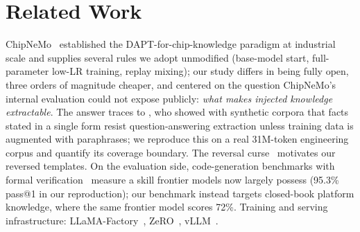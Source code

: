 \section{Related Work}
\label{sec:related}

ChipNeMo~\citep{liu2023chipnemo} established the DAPT-for-chip-knowledge
paradigm at industrial scale and supplies several rules we adopt unmodified
(base-model start, full-parameter low-LR training, replay mixing); our study
differs in being fully open, three orders of magnitude cheaper, and centered
on the question ChipNeMo's internal evaluation could not expose publicly:
\emph{what makes injected knowledge extractable}. The answer traces to
\citet{allenzhu2023physics31}, who showed with synthetic corpora that facts
stated in a single form resist question-answering extraction unless training
data is augmented with paraphrases; we reproduce this on a real 31M-token
engineering corpus and quantify its coverage boundary. The reversal
curse~\citep{berglund2023reversal} motivates our reversed templates. On the
evaluation side, code-generation benchmarks with formal
verification~\citep{yubeaton2025verithoughts} measure a skill frontier models
now largely possess (95.3\% pass@1 in our reproduction); our benchmark instead
targets closed-book platform knowledge, where the same frontier model scores
72\%. Training and serving infrastructure:
LLaMA-Factory~\citep{zheng2024llamafactory},
ZeRO~\citep{rajbhandari2019zero}, vLLM~\citep{kwon2023vllm}.
